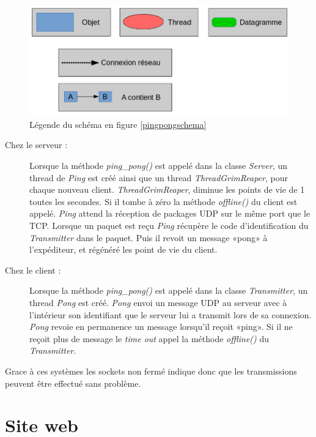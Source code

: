 \documentclass[a4paper, titlepage]{livret}
\begin{document}
\begin{figure}[th]
      \begin{center}
        \includegraphics[scale=0.3]{Assets/l_r_3.png}
        \caption{Légende du schéma en figure \ref{pingpongschema}}
        \label{pingpongschemalegende}
      \end{center}
\end{figure}


\begin{description}
  \item[Chez le serveur : ]
  Lorsque la méthode \textit{ping\_pong()} est appelé dans la classe \textit{Server}, un thread de \textit{Ping} est créé ainsi que un thread \textit{ThreadGrimReaper}, pour chaque nouveau client. 
\textit{ThreadGrimReaper}, diminue les points de vie de 1 toutes les secondes. Si il tombe à zéro la méthode \textit{offline()} du client est appelé.
\textit{Ping} attend la réception de packages UDP sur le même port que le TCP. Lorsque un paquet est reçu \textit{Ping} récupère le code d’identification du \textit{Transmitter} dans le paquet. Puis il revoit un message «pong» à l’expéditeur, et régénéré les point de vie du client.
  
  \item[Chez le client : ]
  Lorsque la méthode \textit{ping\_pong()} est appelé dans la classe \textit{Transmitter}, un thread \textit{Pong} est créé. \textit{Pong} envoi un message UDP au serveur avec à l’intérieur son identifiant que le serveur lui a transmit lors de sa connexion. \textit{Pong} revoie en permanence un message lorsqu’il reçoit «ping». Si il ne reçoit plus de message le \textit{time out} appel la méthode \textit{offline()} du \textit{Transmitter}.
\end{description}

Grace à ces systèmes les sockets non fermé indique donc que les transmissions peuvent être effectué sans problème.


\chapter{Site web}
\end{document}
